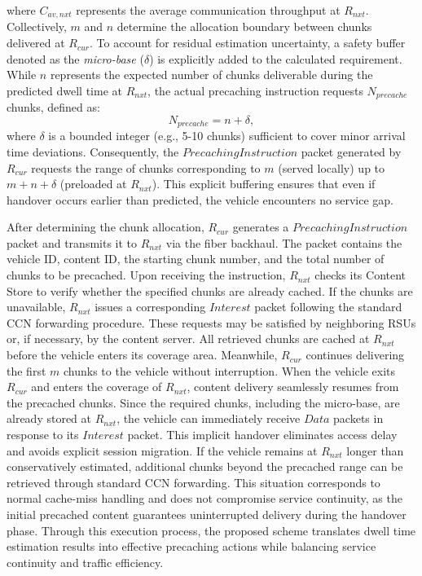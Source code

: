 \documentclass[journal]{IEEEtran}
\begin{document}
where $C_{av, nxt}$ represents the average communication throughput at $R_{nxt}$.
Collectively, $m$ and $n$ determine the allocation boundary between chunks delivered at $R_{cur}$.
%
To account for residual estimation uncertainty, a safety buffer denoted as the \textit{micro-base} ($\delta$) is explicitly added to the calculated requirement.
While $n$ represents the expected number of chunks deliverable during the predicted dwell time at $R_{nxt}$, the actual precaching instruction requests $N_{precache}$ chunks, defined as:
\begin{equation}
    N_{precache} = n + \delta, \label{eq:n_precache}
\end{equation}
where $\delta$ is a bounded integer (e.g., 5-10 chunks) sufficient to cover minor arrival time deviations.
Consequently, the \(Precaching Instruction\) packet generated by $R_{cur}$ requests the range of chunks corresponding to $m$ (served locally) up to $m + n + \delta$ (preloaded at $R_{nxt}$). This explicit buffering ensures that even if handover occurs earlier than predicted, the vehicle encounters no service gap.

After determining the chunk allocation, $R_{cur}$ generates a \(Precaching Instruction\) packet and transmits it to $R_{nxt}$ via the fiber backhaul.
The packet contains the vehicle ID, content ID, the starting chunk number, and the total number of chunks to be precached.
Upon receiving the instruction, $R_{nxt}$ checks its Content Store to verify whether the specified chunks are already cached.
If the chunks are unavailable, $R_{nxt}$ issues a corresponding \(Interest\) packet following the standard CCN forwarding procedure.
These requests may be satisfied by neighboring RSUs or, if necessary, by the content server.
All retrieved chunks are cached at $R_{nxt}$ before the vehicle enters its coverage area.
Meanwhile, $R_{cur}$ continues delivering the first $m$ chunks to the vehicle without interruption.
When the vehicle exits $R_{cur}$ and enters the coverage of $R_{nxt}$, content delivery seamlessly resumes from the precached chunks.
Since the required chunks, including the micro-base, are already stored at $R_{nxt}$, the vehicle can immediately receive \(Data\) packets in response to its \(Interest\) packet.
This implicit handover eliminates access delay and avoids explicit session migration.
If the vehicle remains at $R_{nxt}$ longer than conservatively estimated, additional chunks beyond the precached range can be retrieved through standard CCN forwarding.
This situation corresponds to normal cache-miss handling and does not compromise service continuity, as the initial precached content guarantees uninterrupted delivery during the handover phase.
Through this execution process, the proposed scheme translates dwell time estimation results into effective precaching actions while balancing service continuity and traffic efficiency.
\end{document}
